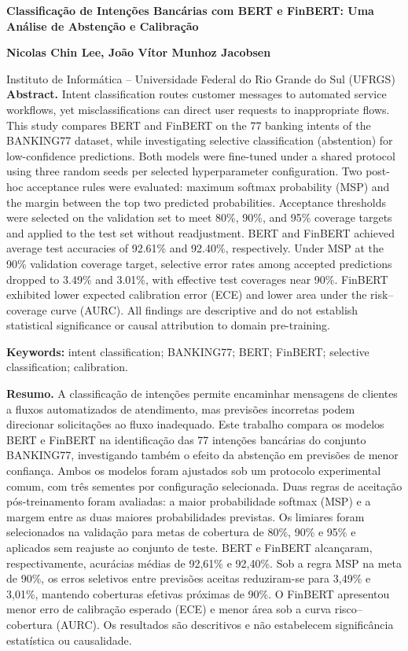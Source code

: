 \documentclass[12pt,a4paper]{article}
\begin{document}
\begin{center}
{\Large\bfseries \textbf{Classificação de Intenções Bancárias com BERT e FinBERT: Uma Análise de Abstenção e Calibração}\par}
\end{center}

\textbf{Nicolas Chin Lee, João Vítor Munhoz Jacobsen}

Instituto de Informática – Universidade Federal do Rio Grande do Sul (UFRGS)\\

\textbf{Abstract.} Intent classification routes customer messages to automated service workflows, yet misclassifications can direct user requests to inappropriate flows. This study compares BERT and FinBERT on the 77 banking intents of the BANKING77 dataset, while investigating selective classification (abstention) for low-confidence predictions. Both models were fine-tuned under a shared protocol using three random seeds per selected hyperparameter configuration. Two post-hoc acceptance rules were evaluated: maximum softmax probability (MSP) and the margin between the top two predicted probabilities. Acceptance thresholds were selected on the validation set to meet 80\%, 90\%, and 95\% coverage targets and applied to the test set without readjustment. BERT and FinBERT achieved average test accuracies of 92.61\% and 92.40\%, respectively. Under MSP at the 90\% validation coverage target, selective error rates among accepted predictions dropped to 3.49\% and 3.01\%, with effective test coverages near 90\%. FinBERT exhibited lower expected calibration error (ECE) and lower area under the risk–coverage curve (AURC). All findings are descriptive and do not establish statistical significance or causal attribution to domain pre-training.

\textbf{Keywords:} intent classification; BANKING77; BERT; FinBERT; selective classification; calibration.

\textbf{Resumo.} A classificação de intenções permite encaminhar mensagens de clientes a fluxos automatizados de atendimento, mas previsões incorretas podem direcionar solicitações ao fluxo inadequado. Este trabalho compara os modelos BERT e FinBERT na identificação das 77 intenções bancárias do conjunto BANKING77, investigando também o efeito da abstenção em previsões de menor confiança. Ambos os modelos foram ajustados sob um protocolo experimental comum, com três sementes por configuração selecionada. Duas regras de aceitação pós-treinamento foram avaliadas: a maior probabilidade softmax (MSP) e a margem entre as duas maiores probabilidades previstas. Os limiares foram selecionados na validação para metas de cobertura de 80\%, 90\% e 95\% e aplicados sem reajuste ao conjunto de teste. BERT e FinBERT alcançaram, respectivamente, acurácias médias de 92,61\% e 92,40\%. Sob a regra MSP na meta de 90\%, os erros seletivos entre previsões aceitas reduziram-se para 3,49\% e 3,01\%, mantendo coberturas efetivas próximas de 90\%. O FinBERT apresentou menor erro de calibração esperado (ECE) e menor área sob a curva risco–cobertura (AURC). Os resultados são descritivos e não estabelecem significância estatística ou causalidade.
\end{document}
